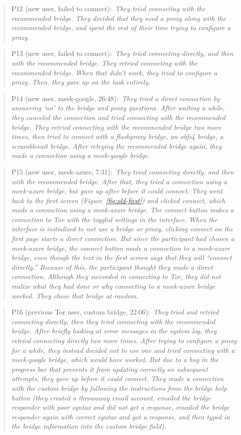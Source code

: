 \documentclass[USenglish,oneside,twocolumn]{article}
\newcommand{\pquote}[2]{
\begin{quotation}
\noindent #1:~\textit{#2}
\end{quotation}
}
\begin{document}
\pquote{P12 (new user, failed to connect)}{They tried connecting with the recommended bridge. They decided that they need a proxy along with the recommended bridge, and spent the rest of their time trying to configure a proxy.}

\pquote{P13 (new user, failed to connect)}{They tried connecting directly, and then with the recommended bridge. They retried connecting with the recommended bridge. When that didn't work, they tried to configure a proxy. Then, they gave up on the task entirely.}

\pquote{P14 (new user, meek-google, 26:48)}{They tried a direct connection by answering `no' to the bridge and proxy questions. After waiting a while, they canceled the connection and tried connecting with the recommended bridge. They retried connecting with the recommended bridge two more times, then tried to connect with a flashproxy bridge, an obfs4 bridge, a scramblesuit bridge. After retrying the recommended bridge again, they made a connection using a meek-google bridge.}

\pquote{P15 (new user, meek-azure, 7:31)}{They tried connecting directly, and then with the recommended bridge. After that, they tried a connection using a meek-azure bridge, but gave up after before it could connect. They went back to the first screen (Figure~\ref{fig:old-first}) and clicked connect, which made a connection using a meek-azure bridge. The connect button makes a connection to Tor with the toggled settings in the interface. When the interface is initialized to not use a bridge or proxy, clicking connect on the first page starts a direct connection. But since the participant had chosen a meek-azure bridge, the connect button made a connection to a meek-azure bridge, even though the text in the first screen says that they will ``connect directly.'' Because of this, the participant thought they made a direct connection. Although they succeeded in connecting to Tor, they did not realize what they had done or why connecting to a meek-azure bridge worked. They chose that bridge at random.}

\pquote{P16 (previous Tor user, custom bridge, 22:06)}{They tried and retried connecting directly, then they tried connecting with the recommended bridge. After briefly looking at error messages in the system log, they retried connecting directly two more times. After trying to configure a proxy for a while, they instead decided not to use one and tried connecting with a meek-google bridge, which would have worked. But  due to a bug in the progress bar that prevents it from updating correctly on subsequent attempts, they gave up before it could connect. They made a connection with the custom bridge by following the instructions from the bridge help button (they created a throwaway email account, emailed the bridge responder with poor syntax and did not get a response, emailed the bridge responder again with correct syntax and got a response, and then typed in the bridge information into the custom bridge field).}
\end{document}
